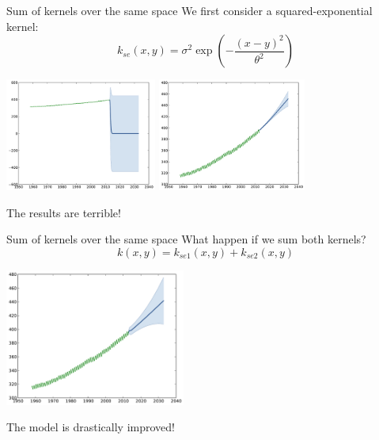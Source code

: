 \begin{frame}{Sum of kernels over the same space }
We first consider a squared-exponential kernel:
$$ \displaystyle k_{se}(x,y) = \sigma^2\exp \left(-\frac{(x-y)^2}{\theta^2} \right)$$
\begin{center}
\includegraphics[height=3.7cm]{3_gaussian_process_regression/figures/python/CO2-rbfa} \quad \includegraphics[height=3.7cm]{3_gaussian_process_regression/figures/python/CO2-rbfb}
\end{center}
\begin{block}{}
\centering
\alert{The results are terrible!}
\end{block}
\end{frame}

\begin{frame}{Sum of kernels over the same space }
What happen if we sum both kernels?
\begin{equation*}
k(x,y) = k_{se1}(x,y) + k_{se2}(x,y)
\end{equation*}
\pause
\begin{center}
\vspace{-8mm} \includegraphics[height=4.5cm]{3_gaussian_process_regression/figures/python/CO2-rbfab}
\end{center}
\begin{block}{}
\centering
\alert{The model is drastically improved!}
\end{block}
\end{frame}

